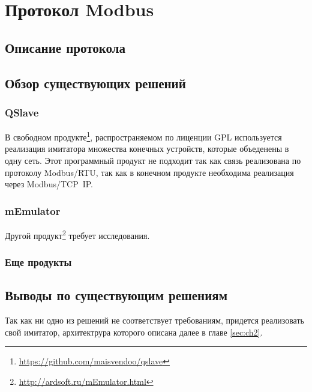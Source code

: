 \chapter{Протокол Modbus}\label{ch:ch1}

\section{Описание протокола}

\section{Обзор существующих решений}\label{sec:ch1/sec1}
\subsection{QSlave}

В свободном продукте\footnote{\url{https://github.com/maisvendoo/qslave}}, распространяемом по лиценции GPL используется
реализация имитатора множества конечных устройств, которые объеденены в одну сеть.
Этот программный продукт не подходит так как связь реализована по протоколу
Modbus/RTU, так как в конечном продукте необходима реализация через Modbus/TCP~IP.

\subsection{mEmulator}
Другой продукт\footnote{\url{http://ardsoft.ru/mEmulator.html}} требует исследования.


\subsection{Еще продукты}


\section{Выводы по существующим решениям}

Так как ни одно из решений не соответствует требованиям, придется реализовать свой
имитатор, архитектрура которого описана далее в главе \ref{sec:ch2}.